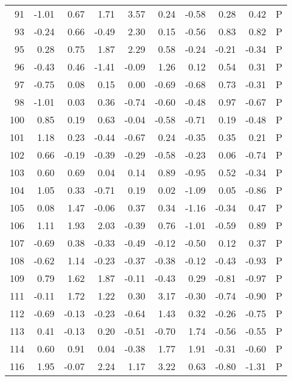 \begin{table}[ht]
\begin{tabular}{rrrrrrrrrl}
  91 & -1.01 & 0.67 & 1.71 & 3.57 & 0.24 & -0.58 & 0.28 & 0.42 & P \\ 
  93 & -0.24 & 0.66 & -0.49 & 2.30 & 0.15 & -0.56 & 0.83 & 0.82 & P \\ 
  95 & 0.28 & 0.75 & 1.87 & 2.29 & 0.58 & -0.24 & -0.21 & -0.34 & P \\ 
  96 & -0.43 & 0.46 & -1.41 & -0.09 & 1.26 & 0.12 & 0.54 & 0.31 & P \\ 
  97 & -0.75 & 0.08 & 0.15 & 0.00 & -0.69 & -0.68 & 0.73 & -0.31 & P \\ 
  98 & -1.01 & 0.03 & 0.36 & -0.74 & -0.60 & -0.48 & 0.97 & -0.67 & P \\ 
  100 & 0.85 & 0.19 & 0.63 & -0.04 & -0.58 & -0.71 & 0.19 & -0.48 & P \\ 
  101 & 1.18 & 0.23 & -0.44 & -0.67 & 0.24 & -0.35 & 0.35 & 0.21 & P \\ 
  102 & 0.66 & -0.19 & -0.39 & -0.29 & -0.58 & -0.23 & 0.06 & -0.74 & P \\ 
  103 & 0.60 & 0.69 & 0.04 & 0.14 & 0.89 & -0.95 & 0.52 & -0.34 & P \\ 
  104 & 1.05 & 0.33 & -0.71 & 0.19 & 0.02 & -1.09 & 0.05 & -0.86 & P \\ 
  105 & 0.08 & 1.47 & -0.06 & 0.37 & 0.34 & -1.16 & -0.34 & 0.47 & P \\ 
  106 & 1.11 & 1.93 & 2.03 & -0.39 & 0.76 & -1.01 & -0.59 & 0.89 & P \\ 
  107 & -0.69 & 0.38 & -0.33 & -0.49 & -0.12 & -0.50 & 0.12 & 0.37 & P \\ 
  108 & -0.62 & 1.14 & -0.23 & -0.37 & -0.38 & -0.12 & -0.43 & -0.93 & P \\ 
  109 & 0.79 & 1.62 & 1.87 & -0.11 & -0.43 & 0.29 & -0.81 & -0.97 & P \\ 
  111 & -0.11 & 1.72 & 1.22 & 0.30 & 3.17 & -0.30 & -0.74 & -0.90 & P \\ 
  112 & -0.69 & -0.13 & -0.23 & -0.64 & 1.43 & 0.32 & -0.26 & -0.75 & P \\ 
  113 & 0.41 & -0.13 & 0.20 & -0.51 & -0.70 & 1.74 & -0.56 & -0.55 & P \\ 
  114 & 0.60 & 0.91 & 0.04 & -0.38 & 1.77 & 1.91 & -0.31 & -0.60 & P \\ 
  116 & 1.95 & -0.07 & 2.24 & 1.17 & 3.22 & 0.63 & -0.80 & -1.31 & P \\ 
   \hline
\end{tabular}
\end{table}
